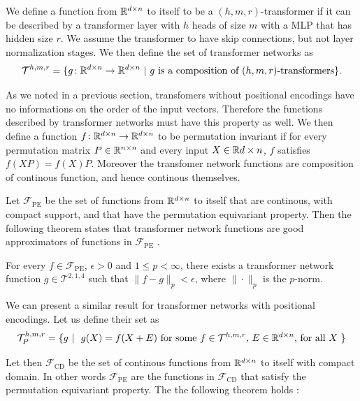 \documentclass[]{marticle}
\begin{document}
We define a function from $\mathbb{R}^{d\times n}$ to itself to be a $(h, m, r)$-transformer if it can be
described by a transformer layer with $h$ heads of size $m$ with a MLP that has hidden size $r$. We
assume the transformer to have skip connections, but not layer normalization stages. We then define
the set of transformer networks as
\begin{equation*}
    \mathcal{T}^{h, m, r} = \{ g\colon \mathbb{R}^{d\times n} \to \mathbb{R}^{d\times n} \ |\ \text{$g$ is a
    composition of $(h,m,r)$-transformers} \}.
\end{equation*}

As we noted in a previous section, transfomers without positional encodings have no informations on
the order of the input vectors. Therefore the functions described by transformer networks must have
this property as well. We then define a function $f\colon\mathbb{R}^{d\times n} \to \mathbb{R}^{d\times n}$ to be
permutation invariant if for every permutation matrix $P\in \mathbb{R}^{n\times n}$ and every input
$X\in\mathbb{R}{d\times n}$, $f$ satisfies $f(XP) = f(X)P$. Moreover the transfomer network functions are
composition of continous function, and hence continous themselves.

Let $\mathcal{F}_\text{PE}$ be the set of functions from $\mathbb{R}^{d\times n}$ to itself that are
continous, with compact support, and that have the permutation equivariant property. Then the
following theorem states that transformer network functions are good approximators of functions in
$\mathcal{F}_\text{PE}$ \cite{transformer-approx}.

\begin{block}[Theorem]
    For every $f\in\mathcal{F}_\text{PE}$, $\epsilon > 0$ and $1 \leq p < \infty$, there exists a
    transformer network function $g\in \mathcal{T}^{2,1,4}$ such that $\|f - g\|_p < \epsilon$,
    where $\|\cdot\|_p$ is the $p$-norm.
\end{block}

We can present a similar result for transformer networks with positional encodings. Let us define
their set as 
\begin{equation*}
    \mathcal{T}^{h, m, r}_P = \{ g \ |\ \text{
        $g(X)=f(X + E)$ for some $f\in\mathcal{T}^{h,m,r}$, $E\in\mathbb{R}^{d\times n}$, for all $X$
    }\}
\end{equation*}

Let then $\mathcal{F}_\text{CD}$ be the set of continous functions from $\mathbb{R}^{d \times n}$ to itself
with compact domain. In other words $\mathcal{F}_\text{PE}$ are the functions in
$\mathcal{F}_\text{CD}$ that satisfy the permutation equivariant property. The the following theorem
holds \cite{transformer-approx}:
\end{document}
